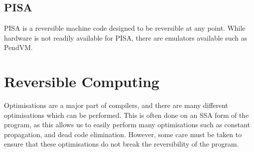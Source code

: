 \subsection*{PISA}
PISA is a reversible machine code designed to be reversible at any point.
While hardware is not readily available for PISA, there are emulators available such as PendVM\cite{PISAVM, ReversibleMachineCode}.

\section*{Reversible Computing}
Optimisations are a major part of compilers, and there are many different optimisations which can be performed.
This is often done on an SSA form of the program, as this allows us to easily perform many optimisations such as constant propagation, and dead code elimination\cite{combiningOptimisation, constantProp}.
However, some care must be taken to ensure that these optimisations do not break the reversibility of the program\cite{OptimiseReversiblePrograms}.
